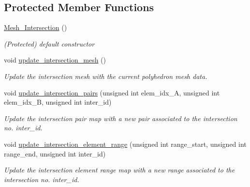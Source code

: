 \subsection*{Protected Member Functions}
\begin{DoxyCompactItemize}
\item 
\hyperlink{classcarl_1_1_mesh___intersection_ac65bb5960ece66fc75c5fb0e28459e59}{Mesh\+\_\+\+Intersection} ()
\begin{DoxyCompactList}\small\item\em (Protected) default constructor \end{DoxyCompactList}\item 
void \hyperlink{classcarl_1_1_mesh___intersection_a040f460bc10dd0fd1d7fb27d25e733ac}{update\+\_\+intersection\+\_\+mesh} ()
\begin{DoxyCompactList}\small\item\em Update the intersection mesh with the current polyhedron mesh data. \end{DoxyCompactList}\item 
void \hyperlink{classcarl_1_1_mesh___intersection_aabfd4b640763d00e1a7786d4724732af}{update\+\_\+intersection\+\_\+pairs} (unsigned int elem\+\_\+idx\+\_\+\+A, unsigned int elem\+\_\+idx\+\_\+\+B, unsigned int inter\+\_\+id)
\begin{DoxyCompactList}\small\item\em Update the intersection pair map with a new pair associated to the intersection no. inter\+\_\+id. \end{DoxyCompactList}\item 
void \hyperlink{classcarl_1_1_mesh___intersection_a86537a2c060ef77c8f9d20f8c5bd6c40}{update\+\_\+intersection\+\_\+element\+\_\+range} (unsigned int range\+\_\+start, unsigned int range\+\_\+end, unsigned int inter\+\_\+id)
\begin{DoxyCompactList}\small\item\em Update the intersection element range map with a new range associated to the intersection no. inter\+\_\+id. \end{DoxyCompactList}\end{DoxyCompactItemize}
